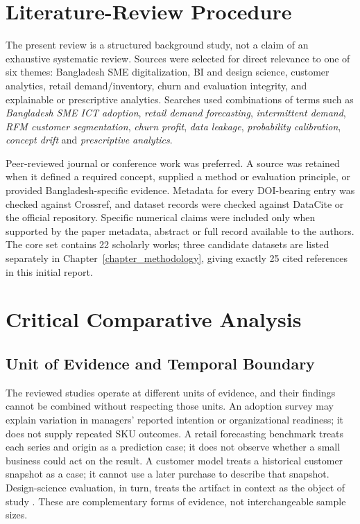 \section{Literature-Review Procedure}
\label{sec:literature_review}

The present review is a structured background study, not a claim of an
exhaustive systematic review. Sources were selected for direct relevance to one
of six themes: Bangladesh SME digitalization, BI and design science, customer
analytics, retail demand/inventory, churn and evaluation integrity, and
explainable or prescriptive analytics. Searches used combinations of terms such
as \emph{Bangladesh SME ICT adoption}, \emph{retail demand forecasting},
\emph{intermittent demand}, \emph{RFM customer segmentation}, \emph{churn
profit}, \emph{data leakage}, \emph{probability calibration}, \emph{concept
drift} and \emph{prescriptive analytics}.

Peer-reviewed journal or conference work was preferred. A source was retained
when it defined a required concept, supplied a method or evaluation principle,
or provided Bangladesh-specific evidence. Metadata for every DOI-bearing entry
was checked against Crossref, and dataset records were checked against DataCite
or the official repository. Specific numerical claims were included only when
supported by the paper metadata, abstract or full record available to the
authors. The core set contains 22 scholarly works; three candidate datasets are
listed separately in Chapter~\ref{chapter_methodology}, giving exactly 25 cited
references in this initial report.

\section{Critical Comparative Analysis}

\subsection{Unit of Evidence and Temporal Boundary}

The reviewed studies operate at different units of evidence, and their findings
cannot be combined without respecting those units. An adoption survey may
explain variation in managers' reported intention or organizational readiness;
it does not supply repeated SKU outcomes. A retail forecasting benchmark treats
each series and origin as a prediction case; it does not observe whether a small
business could act on the result. A customer model treats a historical customer
snapshot as a case; it cannot use a later purchase to describe that snapshot.
Design-science evaluation, in turn, treats the artifact in context as the object
of study \cite{hevner2004design}. These are complementary forms of evidence,
not interchangeable sample sizes.

